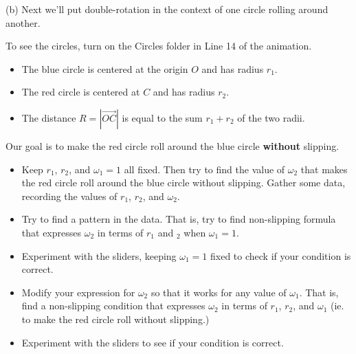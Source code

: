 \documentclass{ximera}
\begin{document}
\begin{exploration}
 
\begin{onlineOnly}
    \begin{center}
\end{center}
\end{onlineOnly}


(b) Next we'll put double-rotation in the context of one circle rolling around another.

To see the circles, turn on the Circles folder in Line 14 of the animation.

\begin{itemize}

\item{The blue circle is centered at the origin $O$ and has radius $r_1$.}

\item{The red circle is centered at $C$ and has radius $r_2$.}
 
\item{The distance $R = |\overrightarrow{OC}|$ is equal to the sum $r_1+r_2$ of the two radii.}

\end{itemize}

Our goal is to make the red circle roll around the blue circle {\bf without} slipping. 

\begin{itemize}

\item{ Keep $r_1$, $r_2$, and $\omega_1=1$ all fixed. Then try to find the value of $\omega_2$ that makes the red circle roll around the blue circle without slipping. Gather some data, recording the values of $r_1$, $r_2$, and $\omega_2$.}

\item{Try to find a pattern in the data. That is, try to find non-slipping formula that expresses $\omega_2$ in terms of $r_1$ and $_2$ when $\omega_1=1$.}

\item{Experiment with the sliders, keeping $\omega_1=1$ fixed to check if your condition is correct.}

\item{Modify your expression for $\omega_2$ so that it works for any value of $\omega_1$. That is, find a non-slipping condition that expresses $\omega_2$ in terms of $r_1$, $r_2$, and $\omega_1$ (ie. to make the red circle roll without slipping.)}

\item{Experiment with the sliders to see if your condition is correct.}

\end{itemize}


\end{exploration}
\end{document}
